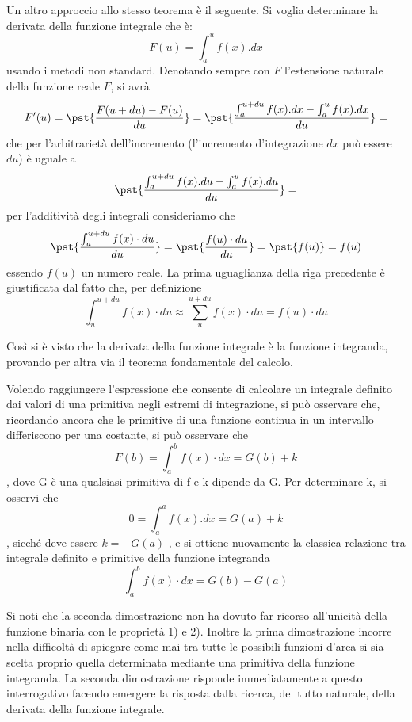 Un altro approccio allo stesso teorema è il seguente.
Si voglia determinare la derivata della funzione integrale che è: 
\[F(u) = \int_a^u f(x).dx\]
usando i metodi non standard. Denotando sempre con \(F\) l'estensione 
naturale della funzione reale \(F\), si avrà
\[F'(u) = \pst{\frac{F(u+du)-F(u)}{du}} = 
\pst{\frac{\int_a^{u+du} f(x).dx - \int_a^u f(x).dx}{du}} =\] 
che per l'arbitrarietà dell'incremento (l'incremento d'integrazione \(dx\) 
può essere \(du\)) è uguale a
\[\pst{\frac{\int_a^{u+du} f(x).du - \int_a^u f(x).du}{du}} =\]
per l'additività degli integrali consideriamo che
\[\pst{\frac{\int_u^{u+du} f(x) \cdot du}{du}} = 
    \pst{\frac{f(u) \cdot du}{du}} = \pst{f(u)} = f(u)\]
essendo \(f(u)\) un numero reale. La prima uguaglianza della riga
precedente è giustificata dal fatto che, per definizione 
\[\int_u^{u+du} f(x) \cdot du \approx \sum_u^{u+du} f(x) \cdot du = 
  f(u) \cdot du\]

 Così si è visto che la derivata della funzione integrale è la funzione 
integranda, provando per altra via il teorema fondamentale del calcolo.

Volendo raggiungere l'espressione che consente di calcolare un integrale 
definito dai valori di una primitiva negli estremi di integrazione, si può 
osservare che, ricordando ancora che le primitive di una funzione continua in 
un intervallo differiscono per una costante, si può osservare che
\[F(b) = \int_a^b f(x)\cdot dx = G(b) + k\],
dove G è una qualsiasi primitiva di f e k dipende da G. Per determinare k, si 
osservi che
\[0 = \int_a^a f(x).dx = G(a) + k\],
sicché deve essere \(k = - G(a)\) , e si ottiene nuovamente la classica 
relazione 
tra integrale definito e primitive della funzione integranda 
\[\int_a^b f(x) \cdot dx = G(b) - G(a)\]

 Si noti che la seconda dimostrazione non ha dovuto far ricorso all'unicità 
della funzione binaria con le proprietà 1) e 2). Inoltre la prima 
dimostrazione incorre nella difficoltà di spiegare come mai tra tutte le 
possibili funzioni d'area si sia scelta proprio quella determinata mediante 
una primitiva della funzione integranda. La seconda dimostrazione risponde 
immediatamente a questo interrogativo facendo emergere la risposta dalla 
ricerca, del tutto naturale, della derivata della funzione integrale.

